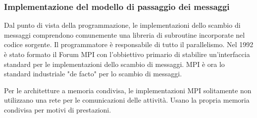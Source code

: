 \subsubsection{Implementazione del modello di passaggio dei messaggi} Dal punto di vista della programmazione, le implementazioni dello scambio di messaggi comprendono comunemente una libreria di subroutine incorporate nel codice sorgente. Il programmatore è responsabile di tutto il parallelismo. Nel 1992 è stato formato il Forum MPI con l'obbiettivo primario di stabilire un'interfaccia standard per le implementazioni dello scambio di messaggi. MPI è ora lo standard industriale "de facto" per lo scambio di messaggi.

Per le architetture a memoria condivisa, le implementazioni MPI solitamente non utilizzano una rete per le comunicazioni delle attività. Usano la propria memoria condivisa per motivi di prestazioni.

